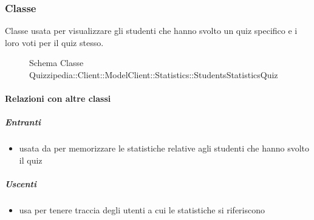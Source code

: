 \subsubsection{Classe }
Classe usata per visualizzare gli studenti che hanno svolto un quiz specifico e i loro voti per il quiz stesso.
\begin{figure}[H]
\centering
\noindent{}
\caption[Schema Classe StudentsStatisticsQuiz]{Schema Classe Quizzipedia::Client::ModelClient::Statistics::StudentsStatisticsQuiz}
\end{figure}
\paragraph{Relazioni con altre classi}
\subparagraph{Entranti}
\begin{itemize}
\item usata da  per memorizzare le statistiche relative agli studenti che hanno svolto il quiz
\end{itemize}
\subparagraph{Uscenti}
\begin{itemize}
\item usa  per tenere traccia degli utenti a cui le statistiche si riferiscono
\end{itemize}
